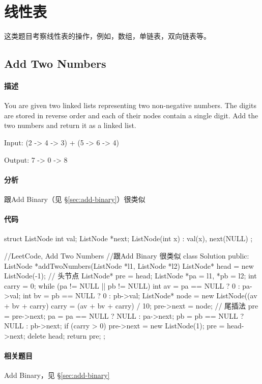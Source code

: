 \chapter{线性表}
这类题目考察线性表的操作，例如，数组，单链表，双向链表等。


\section{Add Two Numbers} %
\label{sec:add-two-numbers}


\subsubsection{描述}
You are given two linked lists representing two non-negative numbers. The digits are stored in reverse order and each of their nodes contain a single digit. Add the two numbers and return it as a linked list.

Input: {\small {} (2 -> 4 -> 3) + (5 -> 6 -> 4)}

Output: {\small {} 7 -> 0 -> 8}


\subsubsection{分析}
跟Add Binary（见 \S \ref{sec:add-binary}）很类似


\subsubsection{代码}
\begin{Code}
struct ListNode {
    int val;
    ListNode *next;
    ListNode(int x) : val(x), next(NULL) { }
};
 
//LeetCode, Add Two Numbers
//跟Add Binary 很类似
class Solution {
public:
    ListNode *addTwoNumbers(ListNode *l1, ListNode *l2) {
        ListNode* head = new ListNode(-1); // 头节点
        ListNode* pre = head;
        ListNode *pa = l1, *pb = l2;
        int carry = 0;
        while (pa != NULL || pb != NULL) {
            int av = pa == NULL ? 0 : pa->val;
            int bv = pb == NULL ? 0 : pb->val;
            ListNode* node = new ListNode((av + bv + carry) %
            carry = (av + bv + carry) / 10;
            pre->next = node; // 尾插法
            pre = pre->next;
            pa = pa == NULL ? NULL : pa->next;
            pb = pb == NULL ? NULL : pb->next;
        }
        if (carry > 0)
            pre->next = new ListNode(1);
        pre = head->next;
        delete head;
        return pre;
    }
};
\end{Code}


\subsubsection{相关题目}

\begindot
\item Add Binary，见 \S \ref{sec:add-binary}
\myenddot

